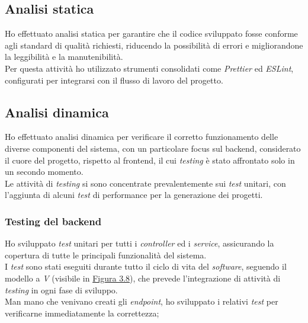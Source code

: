 \subsection{Analisi statica}
\label{subsec:analisi-statica}

Ho effettuato analisi statica per garantire che il codice sviluppato fosse conforme agli standard di qualità richiesti, riducendo la possibilità di errori e migliorandone la leggibilità e la manutenibilità.\\
Per questa attività ho utilizzato strumenti consolidati come \textit{Prettier} ed \textit{ESLint}, configurati per integrarsi con il flusso di lavoro del progetto.\\

\subsection{Analisi dinamica}
\label{subsec:analisi-dinamica}

Ho effettuato analisi dinamica per verificare il corretto funzionamento delle diverse componenti del sistema, con un particolare focus sul \gls{backend}, considerato il cuore del progetto, rispetto al \gls{frontend}, il cui \textit{testing} è stato affrontato solo in un secondo momento. \\
Le attività di \textit{testing} si sono concentrate prevalentemente sui \textit{test} unitari, con l'aggiunta di alcuni \textit{test} di performance per la generazione dei progetti.\\

\subsubsection{Testing del \gls{backend}}  

Ho sviluppato \textit{test} unitari per tutti i \textit{controller} ed i \textit{service}, assicurando la copertura di tutte le principali funzionalità del sistema.\\

\noindent I \textit{test} sono stati eseguiti durante tutto il ciclo di vita del \textit{software}, seguendo il modello a \textit{V} (visibile in {\hyperref[fig:v-model]{Figura 3.8}}), che prevede l’integrazione di attività di \textit{testing} in ogni fase di sviluppo.\\
    Man mano che venivano creati gli \textit{endpoint}, ho sviluppato i relativi \textit{test} per verificarne immediatamente la correttezza;

